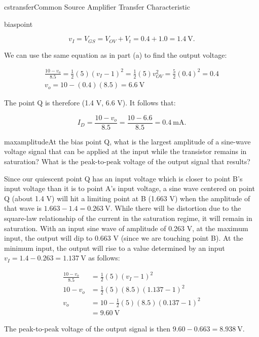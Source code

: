 \begin{mainquestion}{cstransfer}{Common Source Amplifier Transfer Characteristic}
\begin{partquestion}{biaspoint}
\begin{answer}
\[
v_{I} = V_{GS} = V_{OV} + V_{t} = 0.4 + 1.0 = \qty{1.4}{\volt}.
\]

We can use the same equation as in part (a) to find the output voltage:

\begin{gather*}
    \frac{10 - v_o}{8.5} = \frac{1}{2}(5)(v_I - 1)^2 = \frac{1}{2}(5)v_{OV}^2 = \frac{5}{2}(0.4)^2 = 0.4 \\
    v_o = 10 - (0.4)(8.5) = \qty{6.6}{\volt}
\end{gather*}

The point Q is therefore (1.4 V, 6.6 V). It follows that:

\[
I_{D} = \frac{10 - v_{o}}{8.5} = \frac{10 - 6.6}{8.5} = \qty{0.4}{\milli\ampere}.
\]
\end{answer}
\end{partquestion}

\begin{partquestion}{maxamplitude}{At the bias point Q, what is the largest amplitude of a sine-wave voltage signal that can be applied at the input while the transistor remains in saturation? What is the peak-to-peak voltage of the output signal that results?}
\begin{answer}
Since our quiescent point Q has an input voltage which is closer to point B's input voltage than it is to point A's input voltage, a sine wave centered on point Q (about 1.4 V) will hit a limiting point at B (1.663 V) when the amplitude of that wave is $1.663 - 1.4 = \qty{0.263}{\volt}$. While there will be distortion due to the square-law relationship of the current in the saturation regime, it will remain in saturation. With an input sine wave of amplitude of 0.263 V, at the maximum input, the output will dip to 0.663 V (since we are touching point B). At the minimum input, the output will rise to a value determined by an input $v_{I} = 1.4 - 0.263 = \qty{1.137}{\volt}$ as follows:

\begin{align*}
    \frac{10 - v_o}{8.5} &= \frac{1}{2}(5)(v_I - 1)^2 \\
    10 - v_o &= \frac{1}{2}(5)(8.5)(1.137 - 1)^2 \\
    v_o &= 10 - \frac{1}{2}(5)(8.5)(0.137 - 1)^2 \\
    &= \qty{9.60}{\volt}
\end{align*}

The peak-to-peak voltage of the output signal is then $9.60 - 0.663 = \qty{8.938}{\volt}$.
\end{answer}
\end{partquestion}


\end{mainquestion}
